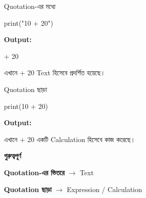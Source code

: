 \begin{examplebox}{Quotation-এর মধ্যে}

\begin{codebox}

\begin{english}
\ttfamily
print("10 + 20")
\end{english}

\end{codebox}

\textbf{Output:}

\begin{codebox}

\begin{english}
 + 20
\end{english}

\end{codebox}

এখানে
\textenglish{ + 20}
Text হিসেবে প্রদর্শিত হয়েছে।

\end{examplebox}

\begin{examplebox}{Quotation ছাড়া}

\begin{codebox}

\begin{english}
\ttfamily
print(10 + 20)
\end{english}

\end{codebox}

\textbf{Output:}

\begin{codebox}

\begin{english}
\end{english}

\end{codebox}

এখানে
\textenglish{ + 20}
একটি Calculation হিসেবে কাজ করেছে।

\end{examplebox}

\begin{rememberbox}

\textbf{\color{deepOrange}গুরুত্বপূর্ণ}

\textbf{Quotation-এর ভিতরে}
\(\longrightarrow\)
Text

\medskip

\textbf{Quotation ছাড়া}
\(\longrightarrow\)
Expression / Calculation

\end{rememberbox}

